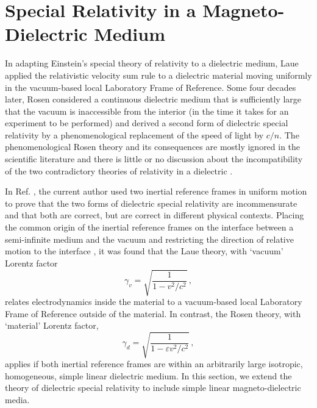 \documentclass[twocolumn,amssymb,eqsecnum,aps,pra]{revtex4-2}
\begin{document}
\section{Special Relativity in a Magneto-Dielectric Medium}
\par
In adapting Einstein's special theory of relativity to a dielectric
medium, Laue \cite{BILaue} applied the relativistic velocity sum rule
to a dielectric material moving uniformly in the vacuum-based local
Laboratory Frame of Reference.
Some four decades later, Rosen \cite{BIRosen} considered a continuous
dielectric medium that is sufficiently large that the vacuum is
inaccessible from the interior (in the time it takes for an experiment
to be performed) and derived a second form of dielectric special
relativity by a phenomenological replacement of the speed of light
by $c/n$.
The phenomenological Rosen theory and its consequences are mostly
ignored in the scientific literature and there is little or no
discussion about the incompatibility of the two contradictory
theories of relativity in a dielectric \cite{BIAJP}.
\par
In Ref. \cite{BIAJP}, the current author used two inertial
reference frames in uniform motion to prove that the two forms of
dielectric special relativity are incommensurate and that both are
correct, but are correct in different physical contexts.
Placing the common origin of the inertial reference frames on the
interface between a semi-infinite medium and the vacuum and restricting
the direction of relative motion to the interface \cite{BIAJP},
it was found that the Laue \cite{BILaue} theory, with `vacuum'
Lorentz factor
\begin{equation}
\gamma_v=\sqrt{\frac{1}{1-v^2/c^2}} \, ,
\label{EQq6.01}
\end{equation}
relates electrodynamics inside the material to a vacuum-based local
Laboratory Frame of Reference outside of the material.
In contrast, the Rosen \cite{BIRosen} theory, with `material' Lorentz
factor,
\begin{equation}
\gamma_d=\sqrt{\frac{1}{1-\varepsilon v^2/c^2}} \, ,
\label{EQq6.02}
\end{equation}
applies if both inertial reference frames are within an arbitrarily
large isotropic, homogeneous, simple linear dielectric medium.
In this section, we extend the theory of dielectric special
relativity \cite{BIAJP} to include simple linear magneto-dielectric
 media.
\par
\end{document}
